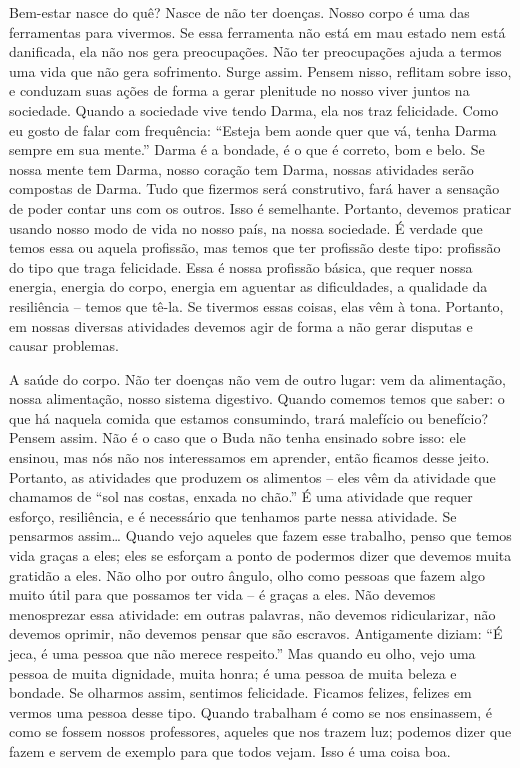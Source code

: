 Bem-estar nasce do quê? Nasce de não ter doenças. Nosso corpo é uma
das ferramentas para vivermos. Se essa ferramenta não está em mau
estado nem está danificada, ela não nos gera preocupações. Não ter
preocupações ajuda a termos uma vida que não gera sofrimento. Surge
assim. Pensem nisso, reflitam sobre isso, e conduzam suas ações de
forma a gerar plenitude no nosso viver juntos na sociedade. Quando a
sociedade vive tendo Darma, ela nos traz felicidade. Como eu gosto de
falar com frequência: “Esteja bem aonde quer que vá, tenha Darma sempre
em sua mente.” Darma é a bondade, é o que é correto, bom e belo. Se
nossa mente tem Darma, nosso coração tem Darma, nossas atividades serão
compostas de Darma. Tudo que fizermos será construtivo, fará haver a
sensação de poder contar uns com os outros. Isso é semelhante.
Portanto, devemos praticar usando nosso modo de vida no nosso país, na
nossa sociedade. É verdade que temos essa ou aquela profissão, mas
temos que ter profissão deste tipo: profissão do tipo que traga
felicidade. Essa é nossa profissão básica, que requer nossa energia,
energia do corpo, energia em aguentar as dificuldades, a qualidade da
resiliência – temos que tê-la. Se tivermos essas coisas, elas vêm à
tona. Portanto, em nossas diversas atividades devemos agir de forma a
não gerar disputas e causar problemas. 

A saúde do corpo. Não ter doenças não vem de outro lugar: vem da
alimentação, nossa alimentação, nosso sistema digestivo. Quando comemos
temos que saber: o que há naquela comida que estamos consumindo, trará
malefício ou benefício? Pensem assim. Não é o caso que o Buda não tenha
ensinado sobre isso: ele ensinou, mas nós não nos interessamos em
aprender, então ficamos desse jeito. Portanto, as atividades que
produzem os alimentos – eles vêm da atividade que chamamos de “sol nas
costas, enxada no chão.” É uma atividade que requer esforço,
resiliência, e é necessário que tenhamos parte nessa atividade. Se
pensarmos assim\ldots{} Quando vejo aqueles que fazem esse trabalho, penso que
temos vida graças a eles; eles se esforçam a ponto de podermos dizer
que devemos muita gratidão a eles. Não olho por outro ângulo,
olho como pessoas que fazem algo muito útil
para que possamos ter vida – é graças a eles. Não devemos
menosprezar essa atividade: em outras
palavras, não devemos ridicularizar, não devemos oprimir, não devemos
pensar que são escravos. Antigamente diziam: “É jeca, é uma pessoa que
não merece respeito.” Mas quando eu olho, vejo uma pessoa de muita
dignidade, muita honra; é uma pessoa de muita beleza e bondade. Se
olharmos assim, sentimos felicidade. Ficamos felizes, felizes em vermos
uma pessoa desse tipo. Quando trabalham é como se nos ensinassem, é
como se fossem nossos professores, aqueles que nos
trazem luz; podemos dizer que fazem e servem
de exemplo para que todos vejam. Isso é uma coisa boa. 

